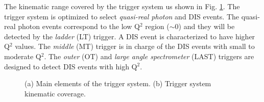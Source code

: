 The kinematic range covered by the trigger system us shown in Fig. \ref{pic:trigger}. The trigger system is optimized to select \textit{quasi-real photon} and DIS events. The quasi-real photon events correspond to the low Q$^2$ region ($\sim$0) and they will be detected by the \textit{ladder} (LT) trigger. A DIS event is characterized to have higher Q$^2$ values. The \textit{middle} (MT) trigger is in charge of the DIS events with small to moderate Q$^2$. The \textit{outer} (OT) and \textit{large angle spectrometer} (LAST) triggers are designed to detect DIS events with high Q$^2$.

\begin{figure}[!h]
  \centering
	\caption{(a) Main elements of the trigger system. (b) Trigger system kinematic coverage.}
	\label{pic:trigger}
\end{figure}

